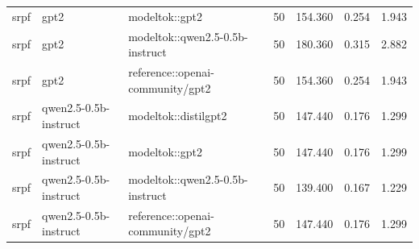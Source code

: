 \begin{table}[t]
\begin{tabular}{lllrrrr}
srpf & gpt2 & modeltok::gpt2 & 50 & 154.360 & 0.254 & 1.943 \\
srpf & gpt2 & modeltok::qwen2.5-0.5b-instruct & 50 & 180.360 & 0.315 & 2.882 \\
srpf & gpt2 & reference::openai-community/gpt2 & 50 & 154.360 & 0.254 & 1.943 \\
srpf & qwen2.5-0.5b-instruct & modeltok::distilgpt2 & 50 & 147.440 & 0.176 & 1.299 \\
srpf & qwen2.5-0.5b-instruct & modeltok::gpt2 & 50 & 147.440 & 0.176 & 1.299 \\
srpf & qwen2.5-0.5b-instruct & modeltok::qwen2.5-0.5b-instruct & 50 & 139.400 & 0.167 & 1.229 \\
srpf & qwen2.5-0.5b-instruct & reference::openai-community/gpt2 & 50 & 147.440 & 0.176 & 1.299 \\
\bottomrule
\end{tabular}
\end{table}
